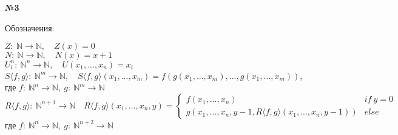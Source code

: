 \documentclass{article}
\newenvironment{task}{\begin{center}\fontsize{14}{14}\selectfont\bf}{\rm\fontsize{12}{12}\selectfont\end{center}}
\newcommand{\N}{\mathbb{N}}
\begin{document}
	\begin{task} 
		№3
	\end{task}
	Обозначения:
	\begin{spacing}{1.4}
	\begin{center}
		$Z:\ \N \rightarrow \N, \quad Z(x) = 0 $\\
		$N:\ \N \rightarrow \N, \quad N(x) = x + 1 $\\
		$U_i^n:\ \N^n \rightarrow \N, \quad U(x_1, ..., x_n) = x_i $\\
		$S\langle f, g\rangle :\ \N^m \rightarrow \N, \quad S\langle f, g\rangle(x_1, ..., x_m) = f(g(x_1, ..., x_m), ..., g(x_1, ..., x_m)) $, где $f:\ \N^n \rightarrow \N,\ g:\ \N^m \rightarrow \N$\\
		$R\langle f, g\rangle :\ \N^{n+1} \rightarrow \N \quad R\langle f, g\rangle(x_1, ..., x_n, y) = \begin{cases}
		f(x_1, ..., x_n) & if \ y = 0 \\
		g(x_1, ..., x_n, y - 1, R\langle f, g\rangle(x_1, ..., x_n, y-1)) & else
		\end{cases}$ \\ где $f:\ \N^n \rightarrow \N,\ g:\ \N^{n+2} \rightarrow \N$\\
	\end{center}


\end{spacing}
\end{document}
